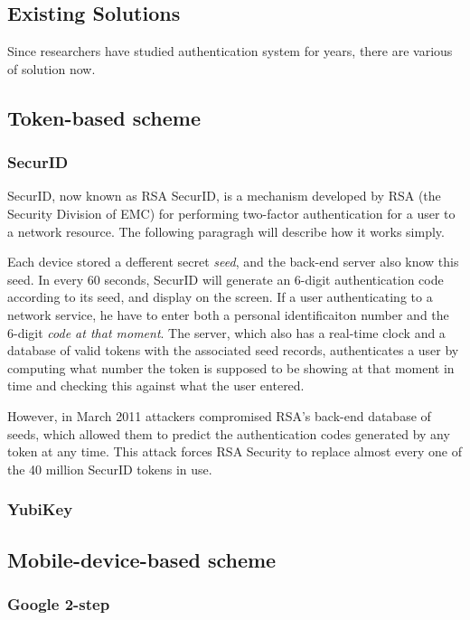 \begin{CJK}{Bg5}{bsmi}
\section{Existing Solutions}

Since researchers have studied authentication system for years, there are various of solution now. 

\subsection{Token-based scheme}

\subsubsection{SecurID}

SecurID, now known as RSA SecurID, is a mechanism developed by RSA (the Security Division of EMC) for performing two-factor authentication for a user to a network resource. The following paragragh will describe how it works simply.

Each device stored a defferent secret \emph{seed}, and the back-end server also know this seed. In every 60 seconds, SecurID will generate an 6-digit authentication code according to its seed, and display on the screen. If a user authenticating to a network service, he have to enter both a personal identificaiton number and the 6-digit \emph{code at that moment}. The server, which also has a real-time clock and a database of valid tokens with the associated seed records, authenticates a user by computing what number the token is supposed to be showing at that moment in time and checking this against what the user entered.

However, in March 2011 attackers compromised RSA's back-end database of seeds, which allowed them to predict the authentication codes generated by any token at any time. This attack forces RSA Security to replace almost every one of the 40 million SecurID tokens in use.

\subsubsection{YubiKey}

\subsection{Mobile-device-based scheme}

\subsubsection{Google 2-step}


\end{CJK}
